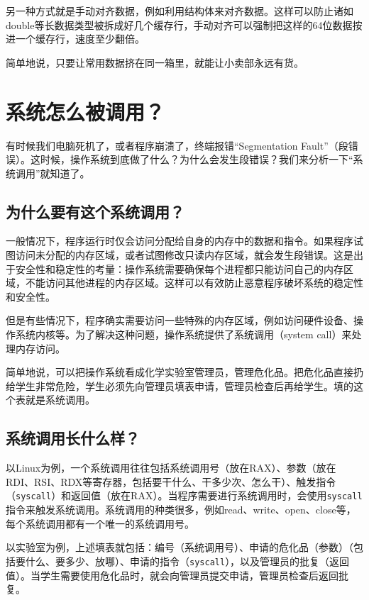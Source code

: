 \documentclass[../main.tex]{subfiles}
\begin{document}
另一种方式就是手动对齐数据，例如利用结构体来对齐数据。这样可以防止诸如double等长数据类型被拆成好几个缓存行，手动对齐可以强制把这样的64位数据按进一个缓存行，速度至少翻倍。

简单地说，只要让常用数据挤在同一箱里，就能让小卖部永远有货。

\section{系统怎么被调用？}

有时候我们电脑死机了，或者程序崩溃了，终端报错“Segmentation Fault”（段错误）。这时候，操作系统到底做了什么？为什么会发生段错误？我们来分析一下“系统调用”就知道了。

\subsection{为什么要有这个系统调用？}

一般情况下，程序运行时仅会访问分配给自身的内存中的数据和指令。如果程序试图访问未分配的内存区域，或者试图修改只读内存区域，就会发生段错误。这是出于安全性和稳定性的考量：操作系统需要确保每个进程都只能访问自己的内存区域，不能访问其他进程的内存区域。这样可以有效防止恶意程序破坏系统的稳定性和安全性。

但是有些情况下，程序确实需要访问一些特殊的内存区域，例如访问硬件设备、操作系统内核等。为了解决这种问题，操作系统提供了系统调用（system call）来处理内存访问。

简单地说，可以把操作系统看成化学实验室管理员，管理危化品。把危化品直接扔给学生非常危险，学生必须先向管理员填表申请，管理员检查后再给学生。填的这个表就是系统调用。

\subsection{系统调用长什么样？}

以Linux为例，一个系统调用往往包括系统调用号（放在RAX）、参数（放在RDI、RSI、RDX等寄存器，包括要干什么、干多少次、怎么干）、触发指令（\texttt{syscall}）和返回值（放在RAX）。当程序需要进行系统调用时，会使用\texttt{syscall}指令来触发系统调用。系统调用的种类很多，例如read、write、open、close等，每个系统调用都有一个唯一的系统调用号。

以实验室为例，上述填表就包括：编号（系统调用号）、申请的危化品（参数）（包括要什么、要多少、放哪）、申请的指令（\texttt{syscall}），以及管理员的批复（返回值）。当学生需要使用危化品时，就会向管理员提交申请，管理员检查后返回批复。
\end{document}
